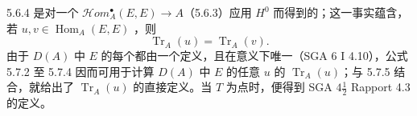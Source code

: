 5.6.4 是对一个 $\mathcal{H}\!om_A^\bullet(E,E)\to A$（5.6.3）应用 $H^0$ 而得到的；这一事实蕴含，若 $u,v\in\operatorname{Hom}_A(E,E)$ ，则
\begin{equation}\operatorname{Tr}_A(u)=\operatorname{Tr}_A(v).\tag{5.7.5}\end{equation}
由于 $D(A)$ 中 $E$ 的每个都由一个定义，且在意义下唯一（SGA 6 I 4.10），公式 5.7.2 至 5.7.4 因而可用于计算 $D(A)$ 中 $E$ 的任意 $u$ 的 $\operatorname{Tr}_A(u)$；与 5.7.5 结合，就给出了 $\operatorname{Tr}_A(u)$ 的直接定义。当 $T$ 为点时，便得到 SGA $4\frac12$ Rapport 4.3 的定义。

